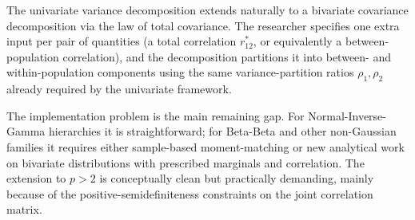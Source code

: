 \documentclass[11pt,a4paper]{article}
\theoremstyle{definition}
\newcommand{\dpr}{r^*}
\begin{document}
The univariate variance decomposition extends naturally to a bivariate
covariance decomposition via the law of total covariance. The
researcher specifies one extra input per pair of quantities (a total
correlation $\dpr_{12}$, or equivalently a between-population
correlation), and the decomposition partitions it into between- and
within-population components using the same variance-partition ratios
$\rho_1, \rho_2$ already required by the univariate framework.

The implementation problem is the main remaining gap. For
Normal-Inverse-Gamma hierarchies it is straightforward; for Beta-Beta
and other non-Gaussian families it requires either sample-based
moment-matching or new analytical work on bivariate distributions with
prescribed marginals and correlation. The extension to $p > 2$ is
conceptually clean but practically demanding, mainly because of the
positive-semidefiniteness constraints on the joint correlation matrix.
\end{document}
